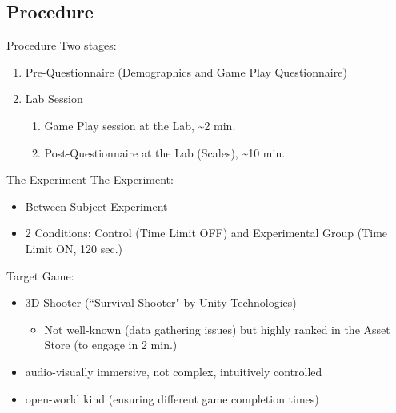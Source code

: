 \documentclass{beamer}
\begin{document}
\subsection{Procedure}
\begin{frame}{Procedure}
\alert{Two stages}: 
\begin{enumerate}
\item Pre-Questionnaire (Demographics and Game Play Questionnaire)
\item Lab Session
	\begin{enumerate}
		\item Game Play session at the Lab, \textasciitilde 2 min.
		\item Post-Questionnaire at the Lab (Scales), \textasciitilde 10 min.
	\end{enumerate}
\end{enumerate}
\end{frame}

\begin{frame}{The Experiment}
\alert{The Experiment}: 
\begin{itemize}
\item Between Subject Experiment
\item 2 Conditions: Control (Time Limit OFF) and Experimental Group (Time Limit ON, 120 sec.)
\end{itemize}
\alert{Target Game}: 
\begin{itemize}
\item 3D Shooter (“Survival Shooter" by Unity Technologies)
\begin{itemize}
	\item Not well-known (data gathering issues) but highly ranked in the Asset Store (to engage in 2 min.)
\end{itemize}
\item audio-visually immersive, not complex, intuitively controlled
\item open-world kind (ensuring different game completion times)

\end{itemize}
\end{frame}
\end{document}
